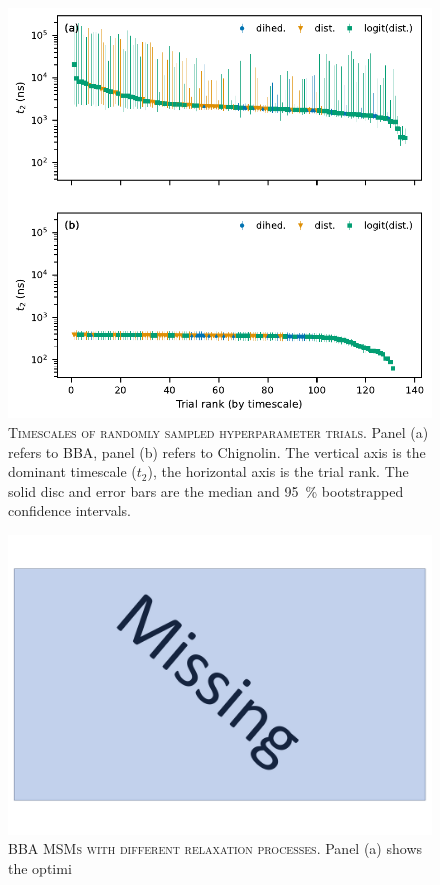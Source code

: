 \documentclass[journal=jacsat,manuscript=article]{achemso}
\begin{document}
\begin{figure}
    \centering
    \includegraphics[width=0.7\columnwidth]{results1/timescale_distributions.pdf}
    \caption{\textsc{Timescales of randomly sampled hyperparameter trials.} Panel (a) refers to BBA, panel (b) refers to Chignolin. The vertical axis is the dominant timescale ($t_2$), the horizontal axis is the trial rank. The solid disc and error bars are the median and \SI{95}{\percent} bootstrapped confidence intervals.  }
    \label{fig:random_trials}
\end{figure}


\begin{figure}
    \centering
    \includegraphics[width=0.7\columnwidth]{missing.pdf}
    \caption{\textsc{BBA MSMs with different relaxation processes.} Panel (a) shows the optimi}
    \label{fig:bba_differences}
\end{figure}
\end{document}
